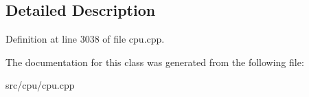 \subsection{Detailed Description}


Definition at line 3038 of file cpu.\-cpp.



The documentation for this class was generated from the following file\-:\begin{DoxyCompactItemize}
\item 
src/cpu/cpu.\-cpp\end{DoxyCompactItemize}
